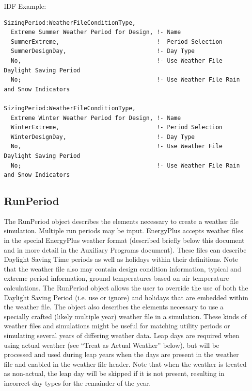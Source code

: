 IDF Example:

\begin{lstlisting}
SizingPeriod:WeatherFileConditionType,
  Extreme Summer Weather Period for Design, !- Name
  SummerExtreme,                            !- Period Selection
  SummerDesignDay,                          !- Day Type
  No,                                       !- Use Weather File Daylight Saving Period
  No;                                       !- Use Weather File Rain and Snow Indicators

SizingPeriod:WeatherFileConditionType,
  Extreme Winter Weather Period for Design, !- Name
  WinterExtreme,                            !- Period Selection
  WinterDesignDay,                          !- Day Type
  No,                                       !- Use Weather File Daylight Saving Period
  No;                                       !- Use Weather File Rain and Snow Indicators
\end{lstlisting}

\subsection{RunPeriod}\label{runperiod}

The RunPeriod object describes the elements necessary to create a weather file simulation. Multiple run
periods may be input. EnergyPlus accepts weather files in the special EnergyPlus weather format
(described briefly below this document and in more detail in the Auxiliary Programs document). These files
can describe Daylight Saving Time periods as well as holidays within their definitions. Note that the weather
file also may contain design condition information, typical and extreme period information, ground
temperatures based on air temperature calculations. The RunPeriod object allows the user to override the use
of both the Daylight Saving Period (i.e. use or ignore) and holidays that are embedded within the weather
file. The object also describes the elements necessary to use a specially crafted (likely multiple year)
weather file in a simulation. These kinds of weather files and simulations might be useful for matching
utility periods or simulating several years of differing weather data. Leap days are required when using
actual weather (see ``Treat as Actual Weather'' below), but will be processed and used during leap years
when the days are present in the weather file and enabled in the weather file header. Note that when the
weather is treated as non-actual, the leap day will be skipped if it is not present, resulting in incorrect
day types for the remainder of the year.

